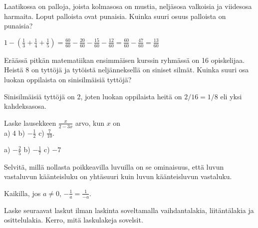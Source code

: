 \begin{tehtavasivu}
\begin{tehtava} 
        Laatikossa on palloja, joista kolmasosa on mustia, neljäsosa
        valkoisia ja viidesosa harmaita. Loput palloista ovat 		 	punaisia.
        Kuinka suuri osuus palloista on punaisia?
        
        \begin{vastaus}
            $1-(\frac{1}{3}+\frac{1}{4}+\frac{1}{5})
            = \frac{60}{60}-\frac{20}{60}-\frac{15}{60}-\frac{12}{60}
            = \frac{60}{60}-\frac{47}{60}
            = \frac{13}{60}$
        \end{vastaus}
    \end{tehtava}
    
\begin{tehtava} 
Eräässä pitkän matematiikan ensimmäisen kurssin ryhmässä on 16 opiskelijaa. Heistä 8 on tyttöjä ja tytöistä neljänneksellä on siniset silmät. Kuinka suuri osa luokan oppilaista on sinisilmäisiä tyttöjä?
        \begin{vastaus}
			Sinisilmäisiä tyttöjä on 2, joten luokan oppilaista heitä on $2/16=1/8$ eli yksi kahdeksasosa.
        \end{vastaus}
\end{tehtava}

\begin{tehtava}
Laske lausekkeen $\frac{x}{2-3x}$ arvo, kun $x$ on \\ a) 4 \qquad b) $-\frac{1}{2}$ \qquad c) $\frac{7}{10}$.
\begin{vastaus}
a) $-\frac{2}{5}$ \qquad b) $-\frac{1}{7}$ \qquad c) $-7$
\end{vastaus}
\end{tehtava}

\begin{tehtava}
Selvitä, millä nollasta poikkeavilla luvuilla on se ominaisuus, että luvun vastaluvun käänteisluku on yhtäsuuri kuin luvun käänteisluvun vastaluku.
\begin{vastaus}
Kaikilla, jos $a \neq 0$, $-\frac{1}{a} = \frac{1}{-a}$.
\end{vastaus}
\end{tehtava}

\begin{tehtava}
Laske seuraavat laskut ilman laskinta soveltamalla vaihdantalakia, liitäntälakia ja osittelulakia.
Kerro, mitä laskulakeja sovelsit.


\end{tehtava}
\end{tehtavasivu}
